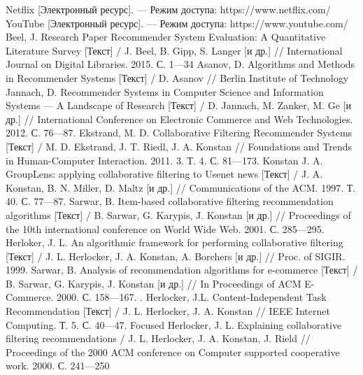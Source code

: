 \begin{thebibliography}{119}
 Netflix [Электронный ресурс]. --- Режим доступа: https://www.netflix.com/
 YouTube [Электронный ресурс]. --- Режим доступа: https://www.youtube.com/
 Beel, J. Research Paper Recommender System Evaluation: A Quantitative Literature
Survey [Текст] / J. Beel, B. Gipp, S. Langer [и др.] // International Journal on Digital
Libraries. 2015. С. 1---34
 Asanov, D. Algorithms and Methods in Recommender Systems [Текст] / D. Asanov // Berlin Institute
of Technology
 Jannach, D. Recommender Systems in Computer Science and Information Systems --- A
Landscape of Research [Текст] / D. Jannach, M. Zanker, M. Ge [и др.] // International
Conference on Electronic Commerce and Web Technologies. 2012. С. 76---87.
 Ekstrand, M. D. Collaborative Filtering Recommender
Systems [Текст] / M. D. Ekstrand, J. T. Riedl, J. A. Konstan
// Foundations and Trends in Human-Computer Interaction. 2011. 3. Т. 4.  С. 81---173.
 Konstan J. A. GroupLens: applying collaborative filtering to Usenet news [Текст] / J. A. Konstan,
B. N. Miller, D. Maltz [и др.] // Communications of the ACM. 1997. Т. 40.
С. 77---87.
 Sarwar, B. Item-based collaborative filtering recommendation algorithms [Текст] / B. Sarwar,
G. Karypis, J. Konstan [и др.] // Proceedings of the 10th international conference
on World Wide Web. 2001. С. 285---295.
 Herloker, J. L. An algorithmic framework for performing collaborative filtering [Текст]  / J. L. Herlocker,
J. A. Konstan, A. Borchers [и др.] // Proc. of SIGIR. 1999.
 Sarwar, B. Analysis of recommendation algorithms for e-commerce [Текст]  / B. Sarwar, G. Karypis,
J. Konstan [и др.] // In Proceedings of ACM E-Commerce. 2000. С. 158---167.
. Herlocker, J.L. Content-Independent Task
Recommendation [Текст]  / J. L. Herlocker, J. A. Konstan // IEEE Internet Computing. Т. 5. С. 40---47.
Focused
 Herlocker, J. L. Explaining collaborative filtering
recommendations / J. L. Herlocker, J. A. Konstan, J. Rield
// Proceedings of the 2000 ACM conference on Computer
supported cooperative work. 2000. С. 241---250


\end{thebibliography}

